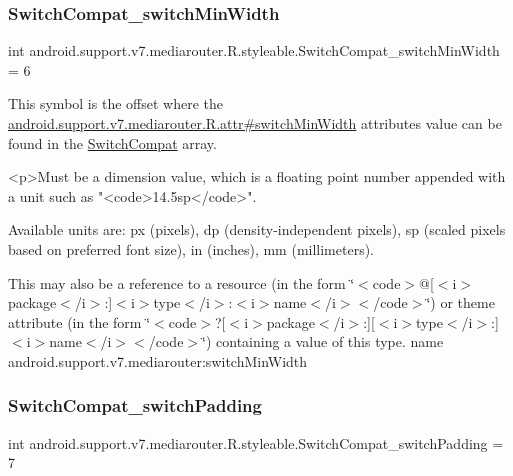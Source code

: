 \subsubsection{\texorpdfstring{Switch\+Compat\+\_\+switch\+Min\+Width}{SwitchCompat\_switchMinWidth}}
{\footnotesize\ttfamily int android.\+support.\+v7.\+mediarouter.\+R.\+styleable.\+Switch\+Compat\+\_\+switch\+Min\+Width = 6\hspace{0.3cm}{\ttfamily [static]}}

This symbol is the offset where the \hyperlink{classandroid_1_1support_1_1v7_1_1mediarouter_1_1R_1_1attr_aa47dc02fb71f6a3ef5a758229456828c}{android.\+support.\+v7.\+mediarouter.\+R.\+attr\#switch\+Min\+Width} attribute\textquotesingle{}s value can be found in the \hyperlink{classandroid_1_1support_1_1v7_1_1mediarouter_1_1R_1_1styleable_af5c7f83276b6c88619833dc8bebeacd9}{Switch\+Compat} array.

\begin{DoxyVerb}      <p>Must be a dimension value, which is a floating point number appended with a unit such as "<code>14.5sp</code>".
\end{DoxyVerb}
 Available units are\+: px (pixels), dp (density-\/independent pixels), sp (scaled pixels based on preferred font size), in (inches), mm (millimeters). 

This may also be a reference to a resource (in the form \char`\"{}$<$code$>$@\mbox{[}$<$i$>$package$<$/i$>$\+:\mbox{]}$<$i$>$type$<$/i$>$\+:$<$i$>$name$<$/i$>$$<$/code$>$\char`\"{}) or theme attribute (in the form \char`\"{}$<$code$>$?\mbox{[}$<$i$>$package$<$/i$>$\+:\mbox{]}\mbox{[}$<$i$>$type$<$/i$>$\+:\mbox{]}$<$i$>$name$<$/i$>$$<$/code$>$\char`\"{}) containing a value of this type.  name android.\+support.\+v7.\+mediarouter\+:switch\+Min\+Width \mbox{\label{classandroid_1_1support_1_1v7_1_1mediarouter_1_1R_1_1styleable_a91af30593f8a1dbd3a82d1b6df6ae8b8}} 
\subsubsection{\texorpdfstring{Switch\+Compat\+\_\+switch\+Padding}{SwitchCompat\_switchPadding}}
{\footnotesize\ttfamily int android.\+support.\+v7.\+mediarouter.\+R.\+styleable.\+Switch\+Compat\+\_\+switch\+Padding = 7\hspace{0.3cm}{\ttfamily [static]}}

